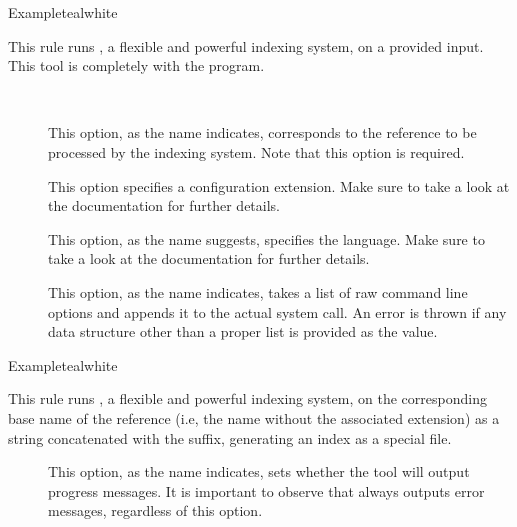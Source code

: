 \begin{description}
\begin{codebox}{Example}{teal}{\icnote}{white}
\end{codebox}

\item[\rulebox{xindex}]
This rule runs , a flexible and powerful indexing system, on a provided  input. This tool is completely with the  program.

\begin{description}
\item[~\rqbox] This option, as the name indicates, corresponds to the  reference to be processed by the indexing system. Note that this option is required.

\item[] This option specifies a configuration extension. Make sure to take a look at the documentation for further details.

\item[] This option, as the name suggests, specifies the language. Make sure to take a look at the documentation for further details.

\item[] This option, as the name indicates, takes a list of raw command line options and appends it to the actual system call. An error is thrown if any data structure other than a proper list is provided as the value.
\end{description}

\begin{codebox}{Example}{teal}{\icnote}{white}
\end{codebox}

\item[\rulebox{xindy}]
This rule runs , a flexible and powerful indexing system, on the corresponding base name of the  reference (i.e, the name without the associated extension) as a string concatenated with the  suffix, generating an index as a special  file.

\begin{description}
\item[] This option, as the name indicates, sets whether the tool will output progress messages. It is important to observe that  always outputs error messages, regardless of this option.


\end{description}
\end{description}
